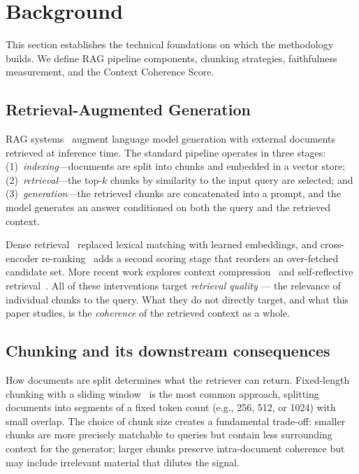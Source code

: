 \section{Background}
\label{sec:background}

This section establishes the technical foundations on which the
methodology builds. We define RAG pipeline components, chunking
strategies, faithfulness measurement, and the Context Coherence Score.

\subsection{Retrieval-Augmented Generation}

RAG systems~\citep{lewis2020rag} augment language model generation with
external documents retrieved at inference time. The standard pipeline
operates in three stages: (1)~\emph{indexing}---documents are split into
chunks and embedded in a vector store; (2)~\emph{retrieval}---the top-$k$
chunks by similarity to the input query are selected; and
(3)~\emph{generation}---the retrieved chunks are concatenated into a prompt,
and the model generates an answer conditioned on both the query and the
retrieved context.

Dense retrieval~\citep{karpukhin2020dpr} replaced lexical matching with
learned embeddings, and cross-encoder re-ranking~\citep{nogueira2019passage,
glass2022re2g} adds a second scoring stage that reorders an over-fetched
candidate set. More recent work explores context
compression~\citep{xu2023recomp} and self-reflective
retrieval~\citep{asai2024selfrag}. All of these interventions target
\emph{retrieval quality} — the relevance of individual chunks to the
query. What they do not directly target, and what this paper studies,
is the \emph{coherence} of the retrieved context as a whole.

\subsection{Chunking and its downstream consequences}

How documents are split determines what the retriever can return.
Fixed-length chunking with a sliding
window~\citep{kamradt2024chunking} is the most common approach, splitting
documents into segments of a fixed token count (e.g., 256, 512, or 1024)
with small overlap. The choice of chunk size creates a fundamental
trade-off: smaller chunks are more precisely matchable to queries but contain
less surrounding context for the generator; larger chunks preserve
intra-document coherence but may include irrelevant material that dilutes
the signal.

